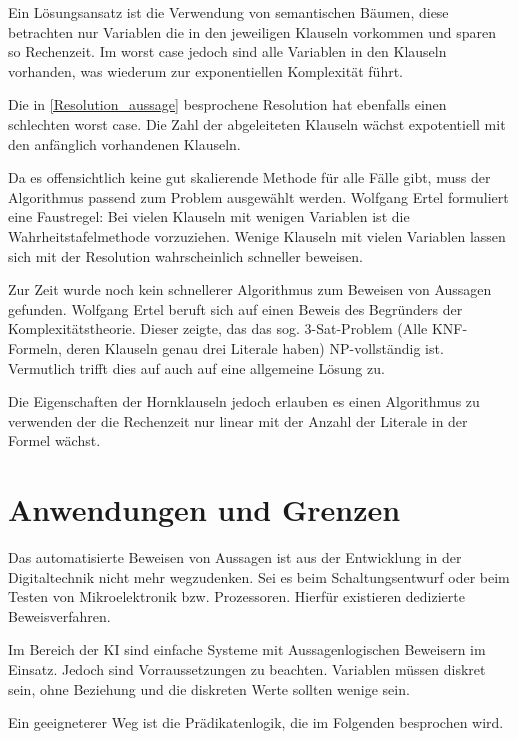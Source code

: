 Ein Lösungsansatz ist die Verwendung von semantischen Bäumen, diese betrachten nur Variablen die in den jeweiligen Klauseln vorkommen und sparen so Rechenzeit. Im worst case jedoch sind alle Variablen in den Klauseln vorhanden, was wiederum zur exponentiellen Komplexität führt.

Die in \ref{Resolution_aussage} besprochene Resolution hat ebenfalls einen \glqq schlechten \grqq{} worst case. Die Zahl der abgeleiteten Klauseln wächst expotentiell mit den anfänglich vorhandenen Klauseln.

Da es offensichtlich keine gut skalierende Methode für alle Fälle gibt, muss der Algorithmus passend zum Problem ausgewählt werden. Wolfgang Ertel formuliert eine Faustregel: Bei vielen Klauseln mit wenigen Variablen ist die Wahrheitstafelmethode vorzuziehen. Wenige Klauseln mit vielen Variablen lassen sich mit der Resolution wahrscheinlich schneller beweisen.

Zur Zeit wurde noch kein schnellerer Algorithmus zum Beweisen von Aussagen gefunden. Wolfgang Ertel beruft sich auf einen Beweis des Begründers der Komplexitätstheorie. Dieser zeigte, das das sog. 3-Sat-Problem (Alle KNF-Formeln, deren Klauseln genau drei Literale haben) NP-vollständig ist. Vermutlich trifft dies auf auch auf eine allgemeine Lösung zu. 

Die Eigenschaften der Hornklauseln jedoch erlauben es einen Algorithmus zu verwenden der die Rechenzeit \glqq nur \grqq{ } linear mit der Anzahl der Literale in der Formel wächst.

\section{Anwendungen und Grenzen}
\label{Anwendung und Grenzen}

Das automatisierte Beweisen von Aussagen ist aus der Entwicklung in der Digitaltechnik nicht mehr wegzudenken. Sei es beim Schaltungsentwurf oder beim Testen von Mikroelektronik bzw. Prozessoren. Hierfür existieren dedizierte Beweisverfahren.

Im Bereich der KI sind einfache Systeme mit Aussagenlogischen Beweisern im Einsatz. Jedoch sind Vorraussetzungen zu beachten. Variablen müssen diskret sein, ohne Beziehung und die diskreten Werte sollten wenige sein.   

Ein geeigneterer Weg ist die Prädikatenlogik, die im Folgenden besprochen wird.

